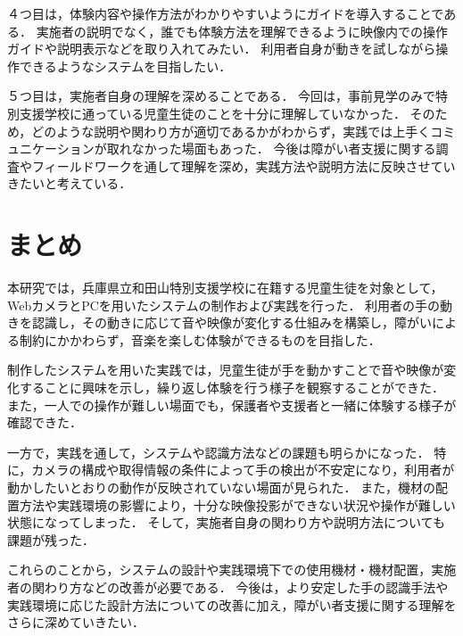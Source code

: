 ４つ目は，体験内容や操作方法がわかりやすいようにガイドを導入することである．
実施者の説明でなく，誰でも体験方法を理解できるように映像内での操作ガイドや説明表示などを取り入れてみたい．
利用者自身が動きを試しながら操作できるようなシステムを目指したい．

５つ目は，実施者自身の理解を深めることである．
今回は，事前見学のみで特別支援学校に通っている児童生徒のことを十分に理解していなかった．
そのため，どのような説明や関わり方が適切であるかがわからず，実践では上手くコミュニケーションが取れなかった場面もあった．
今後は障がい者支援に関する調査やフィールドワークを通して理解を深め，実践方法や説明方法に反映させていきたいと考えている．


\section{まとめ}
本研究では，兵庫県立和田山特別支援学校に在籍する児童生徒を対象として，WebカメラとPCを用いたシステムの制作および実践を行った．
利用者の手の動きを認識し，その動きに応じて音や映像が変化する仕組みを構築し，障がいによる制約にかかわらず，音楽を楽しむ体験ができるものを目指した．

制作したシステムを用いた実践では，児童生徒が手を動かすことで音や映像が変化することに興味を示し，繰り返し体験を行う様子を観察することができた．
また，一人での操作が難しい場面でも，保護者や支援者と一緒に体験する様子が確認できた．

一方で，実践を通して，システムや認識方法などの課題も明らかになった．
特に，カメラの構成や取得情報の条件によって手の検出が不安定になり，利用者が動かしたいとおりの動作が反映されていない場面が見られた．
また，機材の配置方法や実践環境の影響により，十分な映像投影ができない状況や操作が難しい状態になってしまった．
そして，実施者自身の関わり方や説明方法についても課題が残った．

これらのことから，システムの設計や実践環境下での使用機材・機材配置，実施者の関わり方などの改善が必要である．
今後は，より安定した手の認識手法や実践環境に応じた設計方法についての改善に加え，障がい者支援に関する理解をさらに深めていきたい．